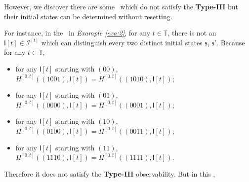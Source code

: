 However, we discover there are some \BCNs\ which do not satisfy the {\bf Type-III} but their initial states can be determined without resetting. 

For instance, in the \BCN\ in {\em Example \ref{exa:2}}, for any $t\in \mathbb{T}$, there is not an $\mathsf{I}[t]\in\mathcal{I}^{[t]}$ which can distinguish every two distinct initial states $\mathsf{s}$, $\mathsf{s}'$. Because for any $t\in \mathbb{T}$,%
\begin{itemize}
\item for any $\mathsf{I}[t]$ starting with $(00)$, $H^{[0,t]}((1001),\mathsf{I}[t])= H^{[0,t]}((1010), \mathsf{I}[t])$;
  \item for any $\mathsf{I}[t]$ starting with $(01)$, $H^{[0,t]}((0000),\mathsf{I}[t])= H^{[0,t]}((0001), \mathsf{I}[t])$;
  \item for any $\mathsf{I}[t]$ starting with $(10)$, $H^{[0,t]}((0100),\mathsf{I}[t])= H^{[0,t]}((0011), \mathsf{I}[t])$;
  \item for any $\mathsf{I}[t]$ starting with $(11)$, $H^{[0,t]}((1110),\mathsf{I}[t])= H^{[0,t]}((1111), \mathsf{I}[t])$.
\end{itemize} 
Therefore it does not satisfy the {\bf Type-III} observability. But in this \BCN,%

